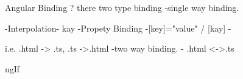 Angular Binding ?
there two type binding
        -single way binding.

            -Interpolation- {{kay}}
            -Propety Binding -[key]="value" / [kay]
            -

            i.e. .html -> .ts, .ts ->.html
        -two way binding.
            - .html <->.ts
            
ngIf
